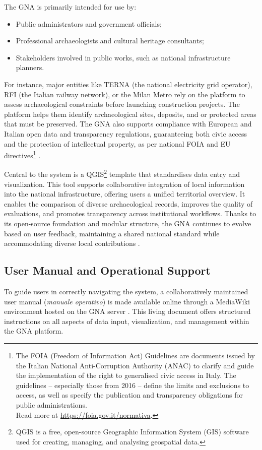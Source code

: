 \begin{spacing}{1.5}
The GNA is primarily intended for use by:
\begin{itemize}
    \item Public administrators and government officials;
    \item Professional archaeologists and cultural heritage consultants;
    \item Stakeholders involved in public works, such as national infrastructure planners.
\end{itemize}

\noindent For instance, major entities like TERNA (the national electricity grid operator), RFI (the Italian railway network), or the Milan Metro rely on the platform to assess archaeological constraints before launching construction projects. The platform helps them identify archaeological sites, deposits, and or protected areas that must be preserved. The GNA also supports compliance with European and Italian open data and transparency regulations, guaranteeing both civic access and the protection of intellectual property, as per national FOIA and EU directives\footnote{The FOIA (Freedom of Information Act) Guidelines are documents issued by the Italian National Anti-Corruption Authority (ANAC) to clarify and guide the implementation of the right to generalised civic access in Italy. The guidelines -- especially those from 2016 -- define the limits and exclusions to access, as well as specify the publication and transparency obligations for public administrations.\\Read more at \url{https://foia.gov.it/normativa}.\nocite{noauthor_normativa_2016}} \citep{falcone_dematerializzazione_2023}.

Central to the system is a QGIS\footnote{QGIS is a free, open-source Geographic Information System (GIS) software used for creating, managing, and analysing geospatial data.} template that standardises data entry and visualization. This tool supports collaborative integration of local information into the national infrastructure, offering users a unified territorial overview. It enables the comparison of diverse archaeological records, improves the quality of evaluations, and promotes transparency across institutional workflows. Thanks to its open-source foundation and modular structure, the GNA continues to evolve based on user feedback, maintaining a shared national standard while accommodating diverse local contributions \citep{calandra_il_2023, boi_il_2023}.

\subsection{User Manual and Operational Support}
To guide users in correctly navigating the system, a collaboratively maintained user manual (\textit{manuale operativo}) is made available online through a MediaWiki environment hosted on the GNA server \citep{gna_wiki_2024}. This living document offers structured instructions on all aspects of data input, visualization, and management within the GNA platform.


\end{spacing}
